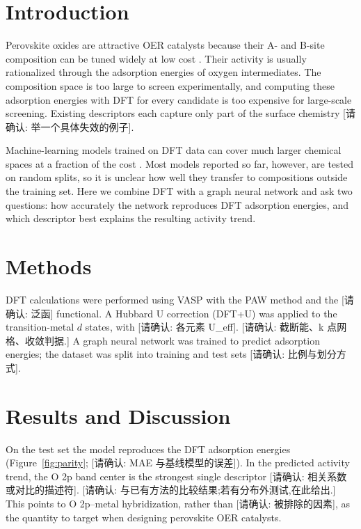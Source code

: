 \documentclass{article}
\begin{document}
\begin{abstract}
Screening perovskite oxides for the oxygen evolution reaction (OER) needs an activity descriptor that is cheaper than computing every adsorption energy with density functional theory (DFT). We trained a graph neural network on DFT adsorption energies of oxygen intermediates [请确认: 数据量与化学空间] and used it to test which electronic-structure quantity tracks the predicted activity. The model reproduces DFT adsorption energies to within [请确认: MAE, eV] on the test set. Across the predicted trend, the O 2p band center correlates with activity more closely than [请确认: 对比的描述符,如 d-band center 或 e_g 占据数].
\end{abstract}

\section{Introduction}
Perovskite oxides are attractive OER catalysts because their A- and B-site composition can be tuned widely at low cost \cite{suntivich2011}. Their activity is usually rationalized through the adsorption energies of oxygen intermediates. The composition space is too large to screen experimentally, and computing these adsorption energies with DFT for every candidate is too expensive for large-scale screening. Existing descriptors each capture only part of the surface chemistry [请确认: 举一个具体失效的例子].

Machine-learning models trained on DFT data can cover much larger chemical spaces at a fraction of the cost \cite{butler2018}. Most models reported so far, however, are tested on random splits, so it is unclear how well they transfer to compositions outside the training set. Here we combine DFT with a graph neural network and ask two questions: how accurately the network reproduces DFT adsorption energies, and which descriptor best explains the resulting activity trend.

\section{Methods}
DFT calculations were performed using VASP with the PAW method and the [请确认: 泛函] functional. A Hubbard U correction (DFT+U) was applied to the transition-metal $d$ states, with [请确认: 各元素 U_eff]. [请确认: 截断能、k 点网格、收敛判据.] A graph neural network was trained to predict adsorption energies; the dataset was split into training and test sets [请确认: 比例与划分方式].

\section{Results and Discussion}
On the test set the model reproduces the DFT adsorption energies (Figure~\ref{fig:parity}; [请确认: MAE 与基线模型的误差]). In the predicted activity trend, the O 2p band center is the strongest single descriptor [请确认: 相关系数或对比的描述符]. [请确认: 与已有方法的比较结果;若有分布外测试,在此给出.] This points to O 2p–metal hybridization, rather than [请确认: 被排除的因素], as the quantity to target when designing perovskite OER catalysts.
\end{document}
